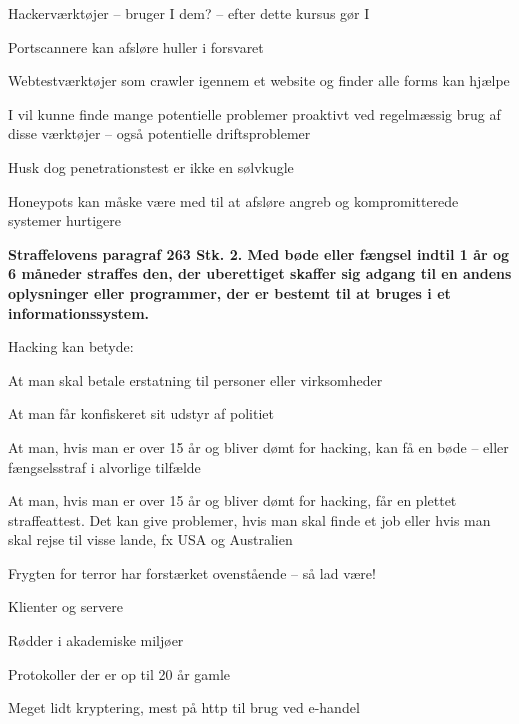 \documentclass[20pt,landscape,a4paper,footrule]{foils}
\begin{document}
\begin{list1}
\item Hackerværktøjer -- bruger I dem? -- efter dette kursus gør I
\item Portscannere kan afsløre huller i forsvaret
\item Webtestværktøjer som crawler igennem et website og finder alle
  forms kan hjælpe
\item I vil kunne finde mange potentielle problemer proaktivt ved
  regelmæssig brug af disse værktøjer -- også potentielle driftsproblemer
\item Husk dog penetrationstest er ikke en sølvkugle
\item Honeypots kan måske være med til at afsløre angreb og
  kompromitterede systemer hurtigere
\end{list1}



{\bfseries Straffelovens paragraf 263 Stk. 2. Med bøde eller fængsel indtil 1 år og 6 måneder straffes den, der uberettiget skaffer sig adgang til en andens oplysninger eller programmer, der er bestemt til at bruges i et informationssystem. }

Hacking kan betyde:
\begin{list2}
\item At man skal betale erstatning til personer eller virksomheder
\item At man får konfiskeret sit udstyr af politiet
\item At man, hvis man er over 15 år og bliver dømt for hacking, kan
  få en bøde -- eller fængselsstraf i alvorlige tilfælde
\item At man, hvis man er over 15 år og bliver dømt for hacking, får
en plettet straffeattest. Det kan give problemer, hvis man skal finde
et job eller hvis man skal rejse til visse lande, fx USA og
Australien
\item Frygten for terror har forstærket ovenstående -- så lad være!
\end{list2}




\begin{list1}
\item Klienter og servere
\item Rødder i akademiske miljøer
\item Protokoller der er op til 20 år gamle
\item Meget lidt kryptering, mest på http til brug ved e-handel
\end{list1}
\end{document}
